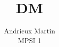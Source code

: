 \documentclass[french]{article}
\title{DM \no 1}
\author{Andrieux Martin\\MPSI 1}
\begin{document}
	\maketitle
	
	\paragraph{}
	
	
\end{document}
